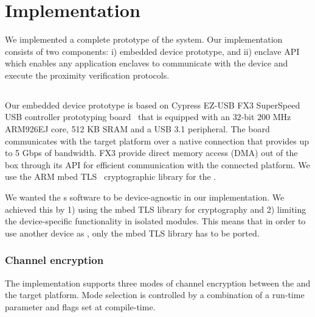 \section{Implementation}
\label{sec:implementation}

We implemented a complete prototype of the \name system. Our implementation consists of two components: i) \device embedded device prototype, and ii) \name enclave API which enables any application enclaves to communicate with the \device device and execute the proximity verification protocols.

\subsection{\device} 

Our embedded device prototype is based on Cypress EZ-USB FX3 SuperSpeed USB controller prototyping board~\cite{fx3} that is equipped with an $32$-bit $200$ MHz ARM926EJ core, 512 KB SRAM and a USB 3.1 peripheral. The board communicates with the target platform over a native  connection that provides up to 5 Gbps of bandwidth. FX3 provide direct memory access (DMA) out of the box through its API for efficient communication with the connected platform. We use the ARM mbed TLS~\cite{mbed} cryptographic library for the \tls.

 We wanted the \device{}s software to be device-agnostic in our implementation. We achieved this by 1) using the mbed TLS library for cryptography and 2) limiting the device-specific functionality in isolated modules. This means that in order to use another device as \device, only the mbed TLS library has to be ported.

\subsubsection{Channel encryption} The implementation supports three modes of channel encryption between the \device and the target platform. Mode selection is controlled by a combination of a run-time parameter and flags set at compile-time.


